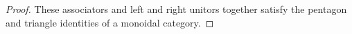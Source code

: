\documentclass[reqno]{amsart}
\begin{document}
\begin{proof}
 These associators and left and right unitors together satisfy the pentagon and triangle identities of a monoidal category. 
\begin{comment}
If we denote the above associator simply as $a$ and the left and right unitors as $\lambda$ and $\rho$, respectively, then given four objects in $F\lCsp_1$, say $M_1, M_2, M_3$ and $M_4$:
\[
\begin{tikzpicture}[scale=1.5]
\node (A) at (0,0) {$a_1$};
\node (B) at (1,0) {$m_1$};
\node (C) at (2,0) {$b_1$};
\node (D) at (1,-0.5) {$x_1 \in F(m_1)$};
\node (E) at (3,0) {$a_2$};
\node (F) at (4,0) {$m_2$};
\node (G) at (5,0) {$b_2$};
\node (H) at (4,-0.5) {$x_2 \in F(m_2)$};
\node (I) at (0,-1.5) {$a_3$};
\node (J) at (1,-1.5) {$m_3$};
\node (K) at (2,-1.5) {$b_3$};
\node (L) at (1,-2) {$x_3 \in F(m_3)$};
\node (M) at (3,-1.5) {$a_4$};
\node (N) at (4,-1.5) {$m_4$};
\node (O) at (5,-1.5) {$b_4$};
\node (P) at (4,-2) {$x_4 \in F(m_4)$};
\path[->,font=\scriptsize,>=angle 90]
(A) edge node[above]{$i_1$} (B)
(C) edge node[above]{$o_1$} (B)
(E) edge node[above]{$i_2$} (F)
(G) edge node[above]{$o_2$} (F)
(I) edge node[above]{$i_3$} (J)
(K) edge node[above]{$o_3$} (J)
(M) edge node[above]{$i_4$} (N)
(O) edge node[above]{$o_4$} (N);
\end{tikzpicture}
\]
then as $\lCsp(\A)$ is a symmetric monoidal double category, the following pentagon of underlying cospans and maps of cospans commutes:
\[
\begin{tikzpicture}[scale=1.5]
\node (A) at (0,0) {$((M_1 \otimes M_2) \otimes M_3) \otimes M_4$};
\node (B) at (2.25,1) {$(M_1 \otimes M_2) \otimes (M_3 \otimes M_4)$};
\node (C) at (4.5,0) {$M_1 \otimes (M_2 \otimes (M_3 \otimes M_4))$};
\node (D) at (.75,-1.5) {$(M_1 \otimes (M_2 \otimes M_3)) \otimes M_4$};
\node (E) at (3.75,-1.5) {$M_1 \otimes ((M_2 \otimes M_3) \otimes M_4)$};
\path[->,font=\scriptsize,>=angle 90]
(A) edge node[above]{$a$} (B)
(B) edge node[above]{$a$} (C)
(A) edge node[left]{$a \otimes 1$} (D)
(D) edge node[above]{$a$} (E)
(E) edge node[right]{$1 \otimes a$} (C);
\end{tikzpicture}
\]
as well as the following pentagon of corresponding decorations in the category $F(m_1 +(m_2 +(m_3+m_4)))$:
\[
\begin{tikzpicture}[scale=1.5]
\node (A) at (-.5,0) {$F(aa)(((x_1+x_2)+x_3)+x_4) $};
\node (B) at (2.25,1) {$F(a)((x_1+x_2)+(x_3+x_4))$};

\end{comment}
\end{proof}
\end{document}
